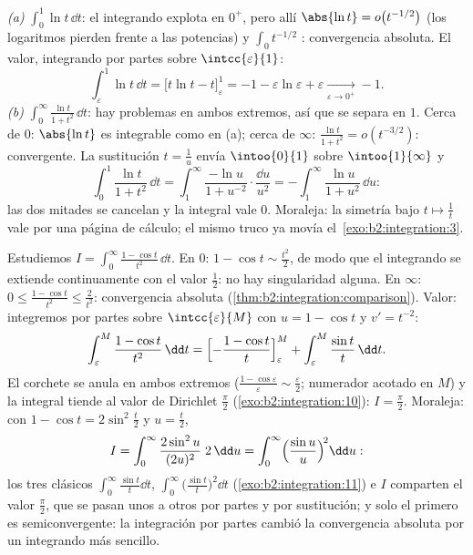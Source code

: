\begin{example}\label{ex:b2:integration:warmups}
\emph{(a)} $\displaystyle\int_0^1 \ln t\,\dd t$: el integrando
explota en $0^+$, pero allí $\abs{\ln t} = o\bigl(t^{-1/2}\bigr)$
(los logaritmos pierden frente a las potencias) y $\int_0 t^{-1/2}$
: convergencia absoluta. El valor, integrando por partes
sobre $\intcc{\varepsilon}{1}$:
\[
\int_\varepsilon^1 \ln t\,\dd t
= \bigl[t\ln t - t\bigr]_\varepsilon^1
= -1 - \varepsilon\ln\varepsilon + \varepsilon
\xrightarrow[\varepsilon\to0^+]{} -1 .
\]
\emph{(b)} $\displaystyle\int_0^\infty \frac{\ln t}{1 +
t^2}\,\dd t$: hay problemas en ambos extremos, así que se separa en
$1$. Cerca de $0$: $\abs{\ln t}$ es integrable como en (a); cerca de
$\infty$: $\frac{\ln t}{1+t^2} = o(t^{-3/2})$: 
convergente. La sustitución $t = \frac1u$ envía $\intoo{0}{1}$ sobre
$\intoo{1}{\infty}$ y
\[
\int_0^1 \frac{\ln t}{1+t^2}\,\dd t
= \int_1^{\infty} \frac{-\ln u}{1 + u^{-2}}\cdot
\frac{\dd u}{u^2}
= -\int_1^\infty \frac{\ln u}{1+u^2}\,\dd u :
\]
las dos mitades se cancelan y la integral vale $0$. Moraleja: la
simetría bajo $t \mapsto \frac1t$ vale por una página de cálculo; el
mismo truco ya movía el~\cref{exo:b2:integration:3}.
\end{example}

\begin{example}\label{ex:b2:integration:onecos}
Estudiemos $I = \displaystyle\int_0^{\infty} \frac{1 - \cos
t}{t^2}\,\dd t$. En $0$: $1 - \cos t \sim \frac{t^2}2$, de modo que
el integrando se extiende continuamente con el valor $\frac12$: no
hay singularidad alguna. En $\infty$: $0 \leq \frac{1 - \cos t}{t^2}
\leq \frac{2}{t^2}$: convergencia absoluta
(\cref{thm:b2:integration:comparison}). Valor: integremos por partes
sobre $\intcc{\varepsilon}{M}$ con $u = 1 - \cos t$ y $v' = t^{-2}$:
\[
\int_\varepsilon^M \frac{1 - \cos t}{t^2}\,\dd t
= \Bigl[-\frac{1 - \cos t}{t}\Bigr]_\varepsilon^M
+ \int_\varepsilon^M \frac{\sin t}{t}\,\dd t .
\]
El corchete se anula en ambos extremos ($\frac{1 -
\cos\varepsilon}{\varepsilon} \sim \frac\varepsilon2$; numerador
acotado en $M$) y la integral tiende al valor de Dirichlet
$\frac\pi2$ (\cref{exo:b2:integration:10}): $I = \frac\pi2$.
Moraleja: con $1 - \cos t = 2\sin^2\frac t2$ y $u = \frac t2$,
\[
I = \int_0^\infty \frac{2\sin^2 u}{(2u)^2}\;2\,\dd u
= \int_0^\infty \Bigl(\frac{\sin u}{u}\Bigr)^{\!2}\dd u :
\]
los tres clásicos $\int_0^\infty\frac{\sin t}{t}\dd t$,
$\int_0^\infty\bigl(\frac{\sin t}{t}\bigr)^2\dd t$
(\cref{exo:b2:integration:11}) e $I$ comparten el valor $\frac\pi2$,
que se pasan unos a otros por partes y por sustitución; y solo el
primero es semiconvergente: la integración por partes cambió la
convergencia absoluta por un integrando más sencillo.
\end{example}

